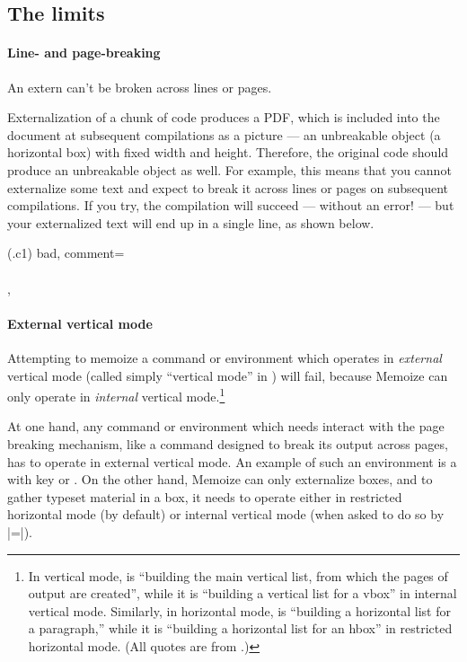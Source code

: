 \documentclass[a4paper,11pt]{article}
\begin{document}
\subsection{The limits}
\label{sec:limits}


\paragraph{Line- and page-breaking} An extern can't be broken across lines or
pages.

Externalization of a chunk of code produces a PDF, which is included into the
document at subsequent compilations as a picture --- an unbreakable object (a
horizontal box) with fixed width and height.  Therefore, the original code
should produce an unbreakable object as well.  For example, this means that you
cannot externalize some text and expect  to break it across lines
or pages on subsequent compilations.  If you try, the compilation will succeed
--- without an error!  --- but your externalized text will end up in a single
line, as shown below.

(.c1){
  bad,
  comment={\centering
    \\[1ex]    
    \\[1ex]
  },
}


\paragraph{External vertical mode}

Attempting to memoize a command or environment which operates in
\emph{external} vertical mode (called simply ``vertical mode'' in \TeXbook)
will fail, because Memoize can only operate in \emph{internal} vertical
mode.\footnote{In vertical mode,  is ``building the main vertical
  list, from which the pages of output are created'', while it is ``building a
  vertical list for a vbox'' in internal vertical mode.  Similarly, in
  horizontal mode,  is ``building a horizontal list for a
  paragraph,'' while it is ``building a horizontal list for an hbox'' in
  restricted horizontal mode.  (All quotes are from \TeXbook[85].)}

At one hand, any command or environment which needs interact with the page
breaking mechanism, like a command designed to break its output across pages,
has to operate in external vertical mode.  An example of such an environment is
a  with key  or .  On
the other hand, Memoize can only externalize boxes, and to gather typeset
material in a box, it needs to operate either in restricted horizontal mode (by
default) or internal vertical mode (when asked to do so by
|=|).
\end{document}

